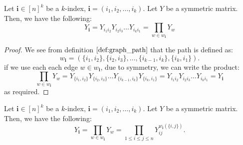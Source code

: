 \begin{lemma}
    \label{lem:multi_index_graph_equivalence}
    \notready
    Let $\mathbf{i} \in[n]^k$ be a $k$-index, $\mathbf{i}=\left(i_1, i_2, \ldots, i_k\right)$. Let $Y$ be a symmetric matrix. Then, we have the following:
     $$
     Y_{\mathbf{i}} = Y_{i_{1}i_{2}} Y_{i_{2}i_{3}} \ldots Y_{i_{k}i_{1}} = \prod_{w \in w_{\mathbf{i}}} Y_{w}
    $$
\end{lemma}

\begin{proof}
\notready
    We see from definition $\ref{def:graph_path}$ that the path is defined as:
    $$
    w_{\mathbf{i}} = (\{i_{1}, i_{2}\}, \{i_{2}, i_{3}\}, \ldots, \{i_{k-1}, i_{k}\}, \{i_{k}, i_{1}\}).
    $$
    if we use each each edge $w \in w_{\mathbf{i}}$, due to symmetry, we can write the product:
    $$
    \prod_{w\in w_{\mathbf{i}}} Y_{w} = Y_{\{i_{1}, i_{2}\}} Y_{\{i_{2}, i_{3}\}} \ldots Y_{\{i_{k-1}, i_{k}\}} Y_{\{i_{k}, i_{1}\}} = Y_{i_{1}i_{2}} Y_{i_{2}i_{3}} \ldots Y_{i_{k}i_{1}} = Y_{\mathbf{i}}
    $$
    as required.
\end{proof}

\begin{lemma}
    \label{lem:graph_walk_count_equivalence}
    \notready
    Let $\mathbf{i} \in[n]^k$ be a $k$-index, $\mathbf{i}=\left(i_1, i_2, \ldots, i_k\right)$. Let $Y$ be a symmetric matrix. Then, we have the following:
     $$
     Y_{\mathbf{i}} = \prod_{w \in w_{\mathbf{i}}} Y_{w} = \prod_{1 \leq i \leq j \leq n} Y_{ij}^{w_{\mathbf{i}}(\{i, j\})}.
    $$
\end{lemma}


